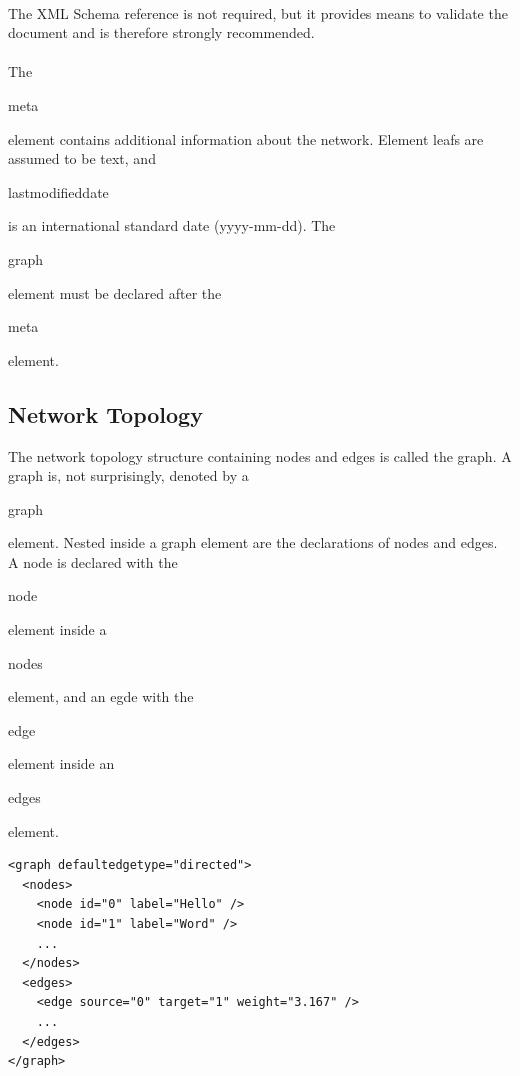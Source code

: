\documentclass[a4paper,10pt]{article}
\begin{document}
\paragraph{}
The XML Schema reference is not required, but it provides means to validate the document and is therefore strongly recommended.

\paragraph{}
The \begin{footnotesize}meta\end{footnotesize} element contains additional information about the network. Element leafs are assumed to be text, and \begin{footnotesize}lastmodifieddate\end{footnotesize} is an international standard date (yyyy-mm-dd). The \begin{footnotesize}graph\end{footnotesize} element must be declared after the \begin{footnotesize}meta\end{footnotesize} element.

\subsection{Network Topology} \label{networktopology}

The network topology structure containing nodes and edges is called the graph. A graph is, not surprisingly, denoted by a \begin{footnotesize}graph\end{footnotesize} element. Nested inside a graph element are the declarations of nodes and edges. A node is declared with the \begin{footnotesize}node\end{footnotesize} element inside a \begin{footnotesize}nodes\end{footnotesize} element, and an egde with the \begin{footnotesize}edge\end{footnotesize} element inside an \begin{footnotesize}edges\end{footnotesize} element.

\lstset{ style=gexf }
\begin{lstlisting}[caption={The definition of the graph},label=topology]
<graph defaultedgetype="directed">
  <nodes>
    <node id="0" label="Hello" />
    <node id="1" label="Word" />
    ...
  </nodes>
  <edges>
    <edge source="0" target="1" weight="3.167" />
    ...
  </edges>
</graph>
\end{lstlisting}
\end{document}
